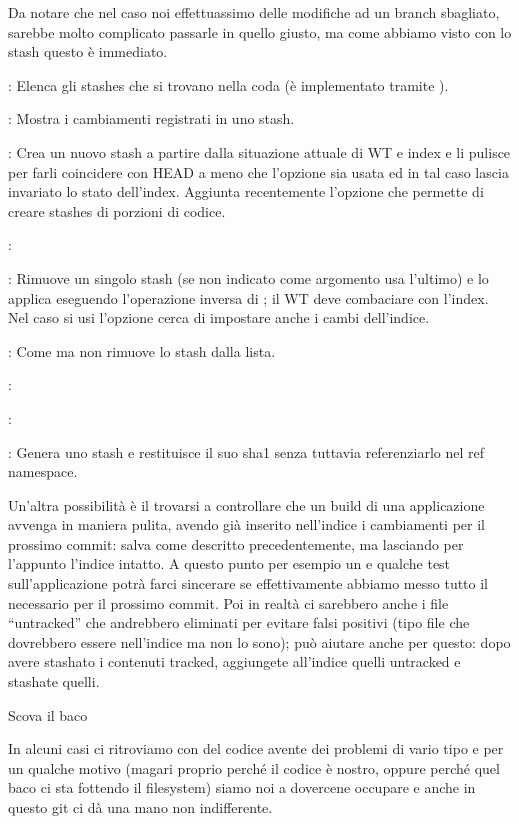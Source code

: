 Da notare che nel caso noi effettuassimo delle modifiche ad un branch
sbagliato, sarebbe molto complicato passarle in quello giusto, ma come abbiamo
visto con lo stash questo \`e immediato.

\elemento{}: Elenca gli stashes che si trovano nella coda (\`e
implementato tramite ).

\elemento{}: Mostra i cambiamenti registrati in uno stash.

\elemento{}: Crea un nuovo stash a partire dalla situazione attuale di
WT e index e li pulisce per farli coincidere con HEAD a meno che l'opzione  sia usata ed in tal caso lascia invariato lo stato dell'index.
Aggiunta recentemente l'opzione  che permette di creare stashes
di porzioni di codice.

\elemento{}:

\elemento{}: Rimuove un singolo stash
(se non indicato come argomento usa l'ultimo) e lo applica eseguendo
l'operazione inversa di ; il WT deve combaciare con l'index.
Nel caso si usi l'opzione  cerca di impostare anche i cambi dell'indice.

\elemento{}: Come  ma non
rimuove lo stash dalla lista.

\elemento{}:

\elemento{}:

\elemento{}: Genera uno stash e restituisce il suo sha1 senza
tuttavia referenziarlo nel ref namespace.

Un'altra possibilit\`a \`e il trovarsi a controllare che un build di una
applicazione avvenga in maniera pulita, avendo gi\`a inserito nell'indice i
cambiamenti per il prossimo commit:  salva
come descritto precedentemente, ma lasciando per l'appunto l'indice intatto. A
questo punto per esempio un  e qualche test sull'applicazione potr\`a
farci sincerare se effettivamente abbiamo messo tutto il necessario per il
prossimo commit. Poi in realt\`a ci sarebbero anche i file ``untracked'' che
andrebbero eliminati per evitare falsi positivi (tipo file che dovrebbero essere
nell'indice ma non lo sono);  pu\`o aiutare anche per questo: dopo
avere stashato i contenuti tracked, aggiungete all'indice quelli untracked e
stashate quelli.

\sezione Scova il baco

In alcuni casi ci ritroviamo con del codice avente dei problemi di vario tipo e
per un qualche motivo (magari proprio perch\'e il codice \`e nostro, oppure
perch\'e quel baco ci sta fottendo il filesystem) siamo noi a dovercene occupare
e anche in questo git ci d\`a una mano non indifferente.

